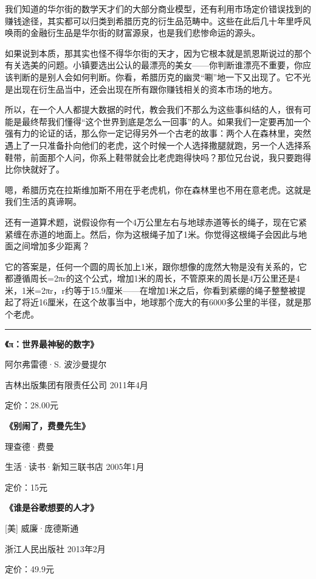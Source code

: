 我们知道的华尔街的数学天才们的大部分商业模型，还有利用市场定价错误找到的赚钱途径，其实都可以归类到希腊历克的衍生品范畴中。这些在此后几十年里呼风唤雨的金融衍生品是华尔街的财富源泉，也是我们悲惨命运的源头。

如果说到本质，那其实也怪不得华尔街的天才，因为它根本就是凯恩斯说过的那个有关选美的问题。小镇要选出公认的最漂亮的美女------你判断谁漂亮不重要，你应该判断的是别人会如何判断。你看，希腊历克的幽灵``唰''地一下又出现了。它不光是出现在衍生品当中，还会出现在所有跟你赚钱相关的资本市场的地方。

所以，在一个人人都提大数据的时代，教会我们不那么为这些事纠结的人，很有可能是最终帮我们懂得``这个世界到底是怎么一回事''的人。如果我们一定要再加一个强有力的论证的话，那么你一定记得另外一个古老的故事：两个人在森林里，突然遇上了一只准备扑向他们的老虎，这个时候一个人选择撒腿就跑，另一个人选择系鞋带，前面那个人问，你系上鞋带就会比老虎跑得快吗？那位兄台说，我只要跑得比你快就好了。

嗯，希腊历克在拉斯维加斯不用在乎老虎机，你在森林里也不用在意老虎。这就是我们生活的真谛啊。

还有一道算术题，说假设你有一个4万公里左右与地球赤道等长的绳子，现在它紧紧缠在赤道的地面上。然后，你为这根绳子加了1米。你觉得这根绳子会因此与地面之间增加多少距离？

它的答案是，任何一个圆的周长加上1米，跟你想像的庞然大物是没有关系的，它都遵循周长=2πr的这个公式，增加1米的周长，不管原来的周长是4万公里还是4米，1米=2πr，r约等于15.9厘米------在增加1米之后，你看到紧绷的绳子整整被提起了将近16厘米，在这个故事当中，地球那个庞大的有6000多公里的半径，就是那个老虎。

\begin{center}\rule{3in}{0.4pt}\end{center}

\textbf{《π：世界最神秘的数字》}

阿尔弗雷德·S. 波沙曼提尔

吉林出版集团有限责任公司 2011年4月

定价：28.00元

\textbf{《别闹了，费曼先生》}

理查德·费曼

生活·读书·新知三联书店 2005年1月

定价：15元

\textbf{《谁是谷歌想要的人才》}

{[}美{]} 威廉·庞德斯通

浙江人民出版社 2013年2月

定价：49.9元

